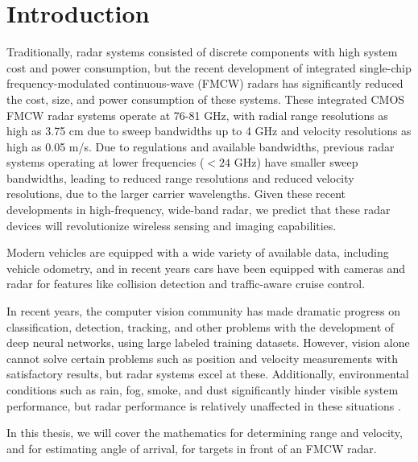 \chapter{Introduction}
Traditionally, radar systems consisted of discrete components with high system
cost and power consumption, but the recent development of integrated single-chip
frequency-modulated continuous-wave (FMCW) radars has significantly reduced the cost,
size, and power consumption of these systems. These
integrated CMOS FMCW radar systems operate at 76-81 GHz, with radial range resolutions
as high as 3.75 cm due to sweep bandwidths up to 4 GHz and velocity resolutions
as high as 0.05 m/s. Due to regulations and available bandwidths,
previous radar systems operating at lower frequencies ($<24$ GHz) have smaller
sweep bandwidths, leading to reduced range resolutions and reduced velocity
resolutions, due to the larger carrier wavelengths. Given these recent developments in
high-frequency, wide-band radar, we predict that these radar devices will
revolutionize wireless sensing and imaging capabilities. 

Modern vehicles are equipped with a wide variety of available data, including
vehicle odometry, and in recent years cars have been equipped with cameras and
radar for features like collision detection and traffic-aware cruise control.

In recent years, the computer vision community has made dramatic progress on classification,
detection, tracking, and other problems with the development of deep neural
networks, using large labeled training datasets. However, vision alone cannot
solve certain problems such as position and velocity measurements with
satisfactory results, but radar systems excel at these. Additionally, environmental conditions
such as rain, fog, smoke, and dust
significantly hinder visible system performance, but radar performance is
relatively unaffected in these situations \cite{patel2016computational}. 

In this thesis, we will cover the mathematics for determining range and velocity, and
for estimating angle of arrival, for targets in front of an FMCW radar. 
